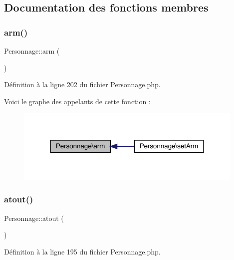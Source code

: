 \subsection{Documentation des fonctions membres}
\mbox{\label{class_personnage_afa3847dccf10793b4512467e6fdb98fc}} 
\subsubsection{\texorpdfstring{arm()}{arm()}}
{\footnotesize\ttfamily Personnage\+::arm (\begin{DoxyParamCaption}{ }\end{DoxyParamCaption})}



Définition à la ligne 202 du fichier Personnage.\+php.

Voici le graphe des appelants de cette fonction \+:\nopagebreak
\begin{figure}[H]
\begin{center}
\leavevmode
\includegraphics[width=310pt]{class_personnage_afa3847dccf10793b4512467e6fdb98fc_icgraph}
\end{center}
\end{figure}
\mbox{\label{class_personnage_a54f0e416a628b1b7246f3c3a7c2081fa}} 
\subsubsection{\texorpdfstring{atout()}{atout()}}
{\footnotesize\ttfamily Personnage\+::atout (\begin{DoxyParamCaption}{ }\end{DoxyParamCaption})}



Définition à la ligne 195 du fichier Personnage.\+php.

